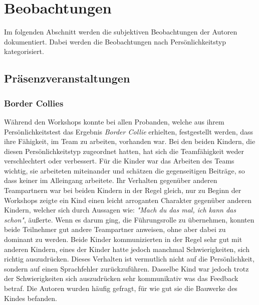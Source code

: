 \chapter{Beobachtungen}
Im folgenden Abschnitt werden die subjektiven Beobachtungen der Autoren dokumentiert. Dabei werden die Beobachtungen nach Persönlichkeitstyp kategorisiert.
\section{Präsenzveranstaltungen}
\subsection*{Border Collies}
Während den Workshops konnte bei allen Probanden, welche aus ihrem Persönlichkeitstest das Ergebnis \textit{Border Collie} erhielten, festgestellt werden, dass ihre Fähigkeit, im Team zu arbeiten, vorhanden war. Bei den beiden Kindern, die diesen Persönlichkeitstyp zugeordnet hatten, hat sich die Teamfähigkeit weder verschlechtert oder verbessert. Für die Kinder war das Arbeiten des Teams wichtig, sie arbeiteten miteinander und schätzen die gegenseitigen Beiträge, so dass keiner im Alleingang arbeitete. Ihr Verhalten gegenüber anderen Teampartnern war bei beiden Kindern in der Regel gleich, nur zu Beginn der Workshops zeigte ein Kind einen leicht arroganten Charakter gegenüber anderen Kindern, welcher sich durch Aussagen wie: \textit{"Mach du das mal, ich kann das schon"}, äußerte. Wenn es darum ging, die Führungsrolle zu übernehmen, konnten beide Teilnehmer gut andere Teampartner anweisen, ohne aber dabei zu dominant zu werden. Beide Kinder kommunizierten in der Regel sehr gut mit anderen Kindern, eines der Kinder hatte jedoch manchmal Schwierigkeiten, sich richtig auszudrücken. Dieses Verhalten ist vermutlich nicht auf die Persönlichkeit, sondern auf einen Sprachfehler zurückzuführen. Dasselbe Kind war jedoch trotz der Schwierigkeiten sich auszudrücken sehr kommunikativ was das Feedback betraf. Die Autoren wurden häufig gefragt, für wie gut sie die Bauwerke des Kindes befanden.


